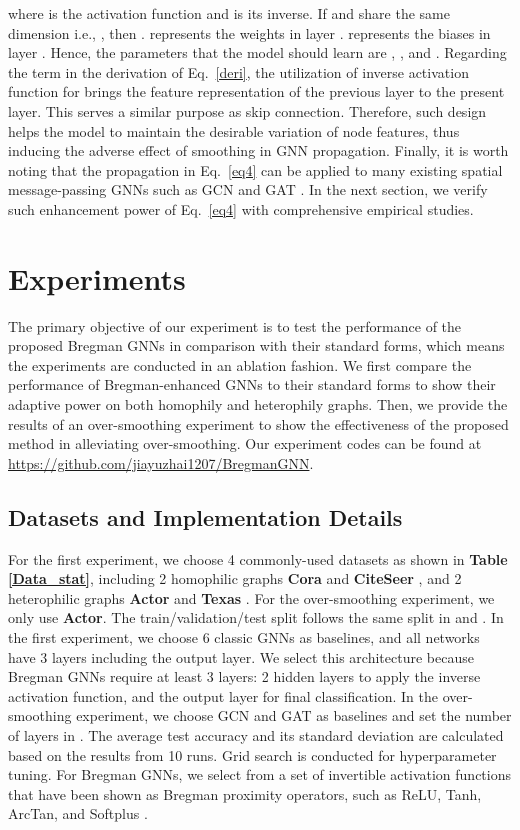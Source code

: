 \documentclass{article}
\begin{document}
where  is the activation function and  is its inverse.
If  and  share the same dimension i.e., , then . 
 represents the weights in layer .
 represents the biases in layer .
Hence, the parameters that the model should learn are , , and .
Regarding the term  in the derivation of Eq.~\eqref{deri}, the utilization of inverse activation function for  brings the feature representation of the previous layer to the present layer. This serves a similar purpose as skip connection. Therefore, such design helps the model to maintain the desirable variation of node features, thus inducing the adverse effect of smoothing in GNN propagation. Finally, it is worth noting that the propagation in Eq.~\eqref{eq4} can be applied to many existing spatial message-passing GNNs such as GCN \cite{kipf2017semisupervised} and GAT \cite{velivckovic2018graph}. In the next section, we verify such enhancement power of Eq.~\eqref{eq4} with comprehensive empirical studies. 


\section{Experiments}\label{Sec:3}
The primary objective of our experiment is to test the performance of the proposed Bregman GNNs in comparison with their standard forms, which means the experiments are conducted in an ablation fashion. 
We first compare the performance of Bregman-enhanced GNNs to their standard forms to show their adaptive power on both homophily and heterophily graphs.
Then, we provide the results of an over-smoothing experiment to show the effectiveness of the proposed method in alleviating over-smoothing. Our experiment codes can be found at \url{https://github.com/jiayuzhai1207/BregmanGNN}.



\subsection{Datasets and Implementation Details}
For the first experiment, we choose 4 commonly-used datasets as shown in \textbf{Table \ref{Data_stat}}, including 2 homophilic graphs \textbf{Cora} \cite{yang2016revisiting} and \textbf{CiteSeer} \cite{yang2016revisiting}, and 2 heterophilic graphs \textbf{Actor} \cite{Pei2020Geom-GCN} and \textbf{Texas} \cite{Pei2020Geom-GCN}. For the over-smoothing experiment, we only use \textbf{Actor}. 
The train/validation/test split follows the same split in  \cite{yang2016revisiting} and \cite{Pei2020Geom-GCN}.
In the first experiment, we choose 6 classic GNNs as baselines, and all networks have 3 layers including the output layer. We select this architecture because Bregman GNNs require at least 3 layers: 2 hidden layers to apply the inverse activation function, and the output layer for final classification. In the over-smoothing experiment, we choose GCN and GAT as baselines and set the number of layers in .
The average test accuracy and its standard deviation are calculated based on the results from 10 runs. Grid search is conducted for hyperparameter tuning.
For Bregman GNNs, we select from a set of invertible activation functions that have been shown as Bregman proximity operators, such as ReLU, Tanh, ArcTan, and Softplus
\cite{frecon2022bregman}.
\end{document}
